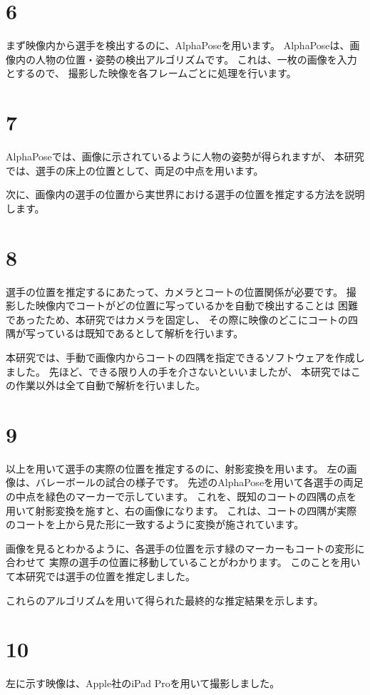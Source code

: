\documentclass[]{jsarticle}
\begin{document}
\section*{6}
    まず映像内から選手を検出するのに、AlphaPoseを用います。
    AlphaPoseは、画像内の人物の位置・姿勢の検出アルゴリズムです。
    これは、一枚の画像を入力とするので、
    撮影した映像を各フレームごとに処理を行います。
\section*{7}
    AlphaPoseでは、画像に示されているように人物の姿勢が得られますが、
    本研究では、選手の床上の位置として、両足の中点を用います。

    次に、画像内の選手の位置から実世界における選手の位置を推定する方法を説明します。
\section*{8}
    選手の位置を推定するにあたって、カメラとコートの位置関係が必要です。
    撮影した映像内でコートがどの位置に写っているかを自動で検出することは
    困難であったため、本研究ではカメラを固定し、
    その際に映像のどこにコートの四隅が写っているは既知であるとして解析を行います。

    本研究では、手動で画像内からコートの四隅を指定できるソフトウェアを作成しました。
    先ほど、できる限り人の手を介さないといいましたが、
    本研究ではこの作業以外は全て自動で解析を行いました。
\section*{9}
    以上を用いて選手の実際の位置を推定するのに、射影変換を用います。
    左の画像は、バレーボールの試合の様子です。
    先述のAlphaPoseを用いて各選手の両足の中点を緑色のマーカーで示しています。
    これを、既知のコートの四隅の点を用いて射影変換を施すと、右の画像になります。
    これは、コートの四隅が実際のコートを上から見た形に一致するように変換が施されています。

    画像を見るとわかるように、各選手の位置を示す緑のマーカーもコートの変形に合わせて
    実際の選手の位置に移動していることがわかります。
    このことを用いて本研究では選手の位置を推定しました。

    これらのアルゴリズムを用いて得られた最終的な推定結果を示します。
\section*{10}
    左に示す映像は、Apple社のiPad Proを用いて撮影しました。
\end{document}
